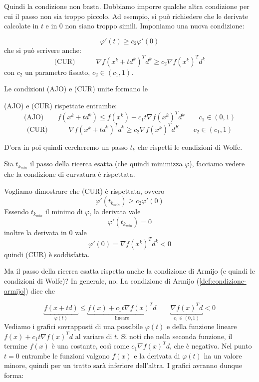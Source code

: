 Quindi la condizione non basta. Dobbiamo imporre qualche altra
condizione per cui il passo non sia troppo piccolo. Ad esempio, si può
richiedere che le derivate calcolate in $t$ e in $0$ non siano troppo
simili. Imponiamo una nuova condizione:
\begin{defn}
\label{def:condizione-curvatura}
$$ \varphi'(t) \geq c_2 \varphi'(0)$$
che si può scrivere anche:
$$  \text{(CUR)} \qquad \quad \nabla f(x^{k} + td^{k})^{T} d^{k} \geq c_2 \nabla f(x^{k})^{T} d^{k}$$
con $c_2$ un parametro fissato, $c_2 \in (c_1, 1)$.
\end{defn}

Le condizioni (AJO) e (CUR) unite formano le
\begin{defn}
\label{defn:condizioni-wolfe} (AJO) e (CUR) rispettate entrambe:
$$  \text{(AJO)} \qquad  f(x^{k}+ td^{k}) \leq  f(x^{k}) + c_1 t \nabla f(x^{k})^{T} d^{k}\qquad c_1\in (0,1)$$
$$  \text{(CUR)} \qquad \quad \nabla f(x^{k} + td^{k})^{T} d^{k} \geq c_2 \nabla f(x^{k})^{T} d^{K} \qquad c_2 \in (c_1, 1)$$
\end{defn}

D'ora in poi quindi cercheremo un passo $t_k$ che rispetti le
condizioni di Wolfe.

\begin{property}
\label{prop:passo-ricerca-esatta-soddisfa-wolfe} Sia $t_{k_{min}}$ il
passo della ricerca esatta (che quindi minimizza $\varphi$), facciamo
vedere che la condizione di curvatura \`e rispettata.
\begin{thproof} Vogliamo dimostrare che (CUR) \`e rispettata, ovvero $$
\varphi'(t_{k_{min}}) \geq c_2 \varphi'(0)$$ Essendo $t_{k_{min}}$ il
minimo di $\varphi$, la derivata vale $$\varphi'(t_{k_{min}}) =0$$
inoltre la derivata in $0$ vale $$\varphi'(0) = \nabla f(x^{k})^{T}
d^{k} < 0 $$ quindi (CUR) \`e soddisfatta.
\end{thproof}
\end{property}

Ma il passo della ricerca esatta rispetta anche la condizione di
Armijo (e quindi le condizioni di Wolfe)? In generale, no. La
condizione di Armijo (\ref{def:condizione-armijo}) dice che

$$ \underbracket{f(x + td)}_{\varphi(t)} \leq \underbracket{f(x) + c_1 t \nabla f(x)^{T}d}_{\text{lineare}} \qquad \underbracket{\nabla f(x)^Td}_{c_1 \in (0,1)} < 0$$
Vediamo i grafici sovrapposti di una possibile $\varphi(t)$ e della
funzione lineare $f(x) + c_1 t \nabla f(x)^{T}d$ al variare di $t$. Si
noti che nella seconda funzione, il termine $f(x)$ \`e una costante,
così come $c_1 \nabla f(x)^{T}d$, che \`e negativo. Nel punto $t=0$
entrambe le funzioni valgono $f(x)$ e la derivata di $\varphi(t)$ ha
un valore minore, quindi per un tratto sar\`a inferiore dell'altra. I
grafici avranno dunque forma:

